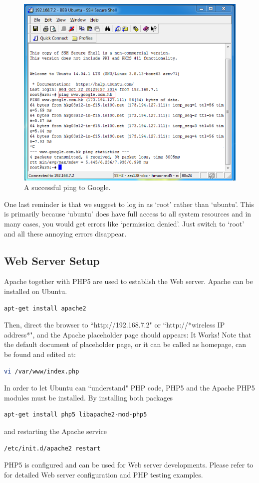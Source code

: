 \documentclass[12pt,journal,draftclsnofoot,onecolumn]{IEEEtran}
\begin{document}
\begin{figure}[htb]
	\centering
	\includegraphics[width=5in]{./figs/ping.PNG}
	\caption{A successful ping to Google.}
	\label{ping}
\end{figure}

One last reminder is that we suggest to log in as `root' rather than `ubuntu'. This is primarily because `ubuntu' does have full access to all system resources and in many cases, you would get errors like `permission denied'. Just switch to `root' and all these annoying errors disappear.

\subsection{Web Server Setup}\label{Webser}
Apache together with PHP5 are used to establish the Web server. Apache can be installed on Ubuntu.
\begin{lstlisting}[language={bash}]
apt-get install apache2
\end{lstlisting}
Then, direct the browser to ``http://192.168.7.2" or ``http://*wireless IP address*", and the Apache placeholder page should appears: It Works! Note that the default document of placeholder page, or it can be called as homepage, can be found and edited at:
\begin{lstlisting}[language={bash}]
vi /var/www/index.php
\end{lstlisting}
	
In order to let Ubuntu can ``understand" PHP code, PHP5 and the Apache PHP5 modules must be installed. By installing both packages
\begin{lstlisting}[language={bash}]
apt-get install php5 libapache2-mod-php5
\end{lstlisting}
and restarting the Apache service
\begin{lstlisting}[language={bash}]
/etc/init.d/apache2 restart
\end{lstlisting}
PHP5 is configured and can be used for Web server developments. Please refer to \cite{Apache} for detailed Web server configuration and PHP testing examples.
\end{document}
